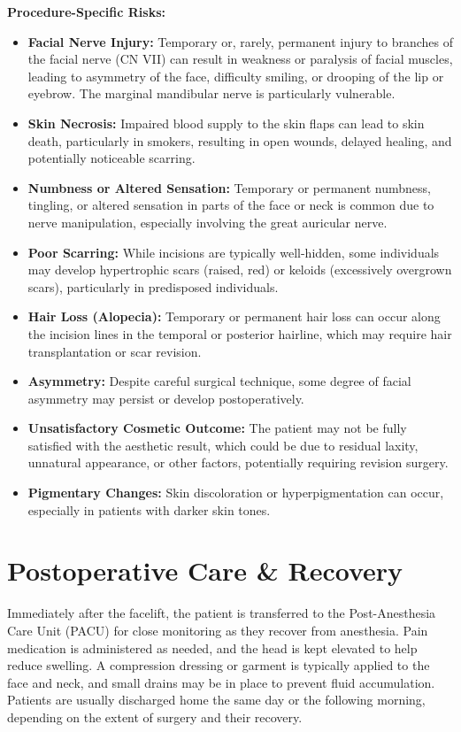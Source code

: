 \textbf{Procedure-Specific Risks:}
\begin{itemize}
  \item \textbf{Facial Nerve Injury:} Temporary or, rarely, permanent injury to branches of the facial nerve (CN VII) can result in weakness or paralysis of facial muscles, leading to asymmetry of the face, difficulty smiling, or drooping of the lip or eyebrow. The marginal mandibular nerve is particularly vulnerable.
  \item \textbf{Skin Necrosis:} Impaired blood supply to the skin flaps can lead to skin death, particularly in smokers, resulting in open wounds, delayed healing, and potentially noticeable scarring.
  \item \textbf{Numbness or Altered Sensation:} Temporary or permanent numbness, tingling, or altered sensation in parts of the face or neck is common due to nerve manipulation, especially involving the great auricular nerve.
  \item \textbf{Poor Scarring:} While incisions are typically well-hidden, some individuals may develop hypertrophic scars (raised, red) or keloids (excessively overgrown scars), particularly in predisposed individuals.
  \item \textbf{Hair Loss (Alopecia):} Temporary or permanent hair loss can occur along the incision lines in the temporal or posterior hairline, which may require hair transplantation or scar revision.
  \item \textbf{Asymmetry:} Despite careful surgical technique, some degree of facial asymmetry may persist or develop postoperatively.
  \item \textbf{Unsatisfactory Cosmetic Outcome:} The patient may not be fully satisfied with the aesthetic result, which could be due to residual laxity, unnatural appearance, or other factors, potentially requiring revision surgery.
  \item \textbf{Pigmentary Changes:} Skin discoloration or hyperpigmentation can occur, especially in patients with darker skin tones.
\end{itemize}

\section*{Postoperative Care \& Recovery}
Immediately after the facelift, the patient is transferred to the Post-Anesthesia Care Unit (PACU) for close monitoring as they recover from anesthesia. Pain medication is administered as needed, and the head is kept elevated to help reduce swelling. A compression dressing or garment is typically applied to the face and neck, and small drains may be in place to prevent fluid accumulation. Patients are usually discharged home the same day or the following morning, depending on the extent of surgery and their recovery.

